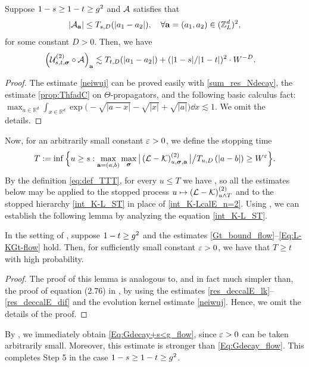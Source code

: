 \begin{lemma}
\label{TailtoTail}
Suppose $1-s\ge 1-t\ge \ilambda^2$ and ${\cal A}$ satisfies that 
$$
|{\cal A}_{\ba}|\le T_{s,D}(|a_1-a_2|),\quad \forall \ba=(a_1,a_2)\in(\Zn)^2,
$$
for some constant $D>0$. Then, we have  
\begin{align}
\label{neiwuj} 
\left({\cal U}^{(2)}_{s,t,\bsig} \circ 
{\cal A}\right)_{\ba} & \lesssim
 {T}_{t,D}( |a_1-a_2|)+(|1-s|/|1-t|)^2\cdot W^{-D} . %
\end{align}
 \end{lemma}
\begin{proof}
The estimate \eqref{neiwuj} can be proved easily with \eqref{sum_res_Ndecay}, the estimate \eqref{prop:ThfadC} on $\Theta$-propagators, and the following basic calculus fact:
$\max_{a\in \mathbb R^d} \int_{x\in \mathbb R^d} \exp\big(-\sqrt{|a-x|}-\sqrt{|x|}+ \sqrt{|a|} \big)\dd x\lesssim 1.$  
We omit the details. %
\end{proof}

Now, for an arbitrarily small constant $\e>0$, we define the stopping time
\begin{align}\label{eq:def_TTT}
T:=\inf \Big\{u\ge s:  \max_{\ba=(a,b)} \max_{\bsig}{\big|\left({\cal L-\cal K}\right)^{(2)}_{u,\bsig, \ba}\big|}\big/{ T}_{u,D}\p{|a-b|} \ge W^\e \Big\} .
\end{align}
By the definition \eqref{eq:def_TTT}, for every $u\le T$ we have , so all the estimates below may be applied to the stopped process $u\mapsto ({\cal L}-{\cal K})^{(2)}_{u\wedge T}$ and to the stopped hierarchy \eqref{int_K-L_ST} in place of \eqref{int_K-LcalE_n=2}. 
Using , we can establish the following lemma by analyzing the equation \eqref{int_K-L_ST}. 

\begin{lemma}\label{lem:pf_step5} 
In the setting of , suppose $1-t\ge \ilambda^2$ and the estimates \eqref{Gt_bound_flow}--\eqref{Eq:L-KGt-flow} hold. Then, for sufficiently small constant $\e>0$, we have that $T\ge t$ with high probability. 
\end{lemma}  
\begin{proof}
The proof of this lemma is analogous to, and in fact much simpler than, the proof of equation (2.76) in \cite[Section 5.3]{YY_25}, by using the estimates \eqref{res_deccalE_lk}--\eqref{res_deccalE_dif} and the evolution kernel estimate \eqref{neiwuj}. Hence, we omit the details of the proof. 
\end{proof}

By , we immediately obtain \eqref{Eq:Gdecay+s<g_flow}, since $\e>0$ can be taken arbitrarily small. Moreover, this estimate is stronger than \eqref{Eq:Gdecay_flow}. This completes Step 5 in the case $1-s\ge 1-t\ge \ilambda^2$. 
